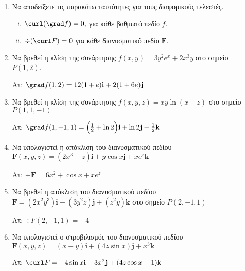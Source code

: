 


\pagestyle{askhseis}
\everymath{\displaystyle}
\renewcommand{\vec}{\mathbf}



\begin{center}
  \minibox{\large\bf \textcolor{Col1}{Κλίση, Απόκλιση, Στροβιλισμός}}
\end{center}

\vspace{\baselineskip}

\begin{enumerate}

\item Να αποδείξετε τις παρακάτω ταυτότητες για τους διαφορικούς τελεστές.

\begin{enumerate}[i)]
\item $\curl(\grad f)=0, $ για κάθε βαθμωτό πεδίο $f$.
\item $\div(\curl F)=0$ για κάθε διανυσματικό πεδίο $ \mathbf{F} $.
\end{enumerate}

\item Να βρεθεί η κλίση της συνάρτησης $ f(x,y)=3y^2e^x+2x^3y $ στο σημείο $P(1,2)$.

\hfill Απ: $\grad f(1,2)=12(1+e)\vec{i}+2(1+6e)\vec{j}$

\item Να βρεθεί η κλίση της συνάρτησης $ f(x,y, z)=xy\ln(x-z) $ στο σημείο $P(1,1,-1)$

\hfill Απ: $\grad f(1,-1,1)=\Bigl(\frac{1}{2}+\ln2\Bigr)\vec{i}+\ln 2\vec{j}- 
\frac{1}{2}\vec{k} $


\item Να υπολογιστεί η απόκλιση του διανυσματικού πεδίου
$ \boldsymbol{F}(x,y,z)=(2x^3-z)\vec{i}+y\cos x\vec{j}+xe^z\vec{k} $

\hfill Απ: $\div\boldsymbol{F}=6x^2+\cos x+xe^z$

\item Να βρεθεί η απόκλιση του διανυσματικού πεδίου 
  $ \boldsymbol{F}=(2x^2y^3)\vec{i}-(3y^2z)\vec{j}+(z^2y)\vec{k} $ στο σημείο $P(2,-1,1)$

\hfill Απ: $\div F(2,-1,1)=-4$

\item Να υπολογιστεί ο στροβιλισμός του διανυσματικού πεδίου
$ \boldsymbol{F}(x,y,z)=(x+y)\vec{i}+(4z\sin x)\vec{j}+x^3\vec{k} $

\hfill Απ: $\curl F=-4\sin x\vec{i}-3x^2\vec{j}+(4z\cos x-1)\vec{k}$


\end{enumerate}
